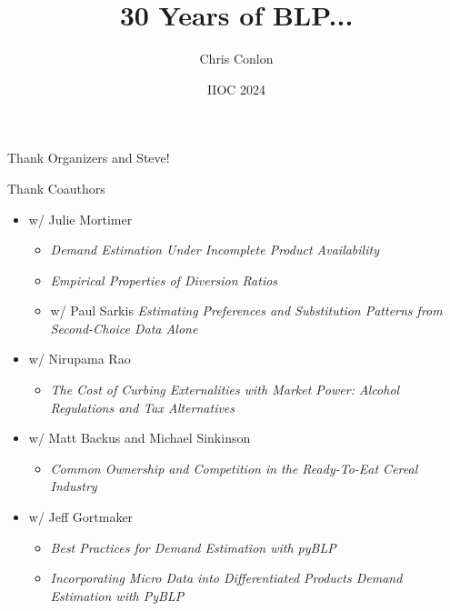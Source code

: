 \documentclass[aspectratio=169,10pt]{beamer}
\title{30 Years of BLP...}
\author{Chris Conlon}
\institute{NYU Stern School of Business and NBER}
\date{IIOC 2024}
\begin{document}
\begin{frame}[plain] %
\titlepage
\end{frame}



\begin{frame}{}
Thank Organizers and Steve!
\end{frame}


\begin{frame}{Thank Coauthors}
\begin{itemize}
    \item w/ Julie Mortimer

    \begin{itemize}
        \item \textit{Demand Estimation Under Incomplete Product Availability}
        \item \textit {Empirical Properties of Diversion Ratios}
        \item w/ Paul Sarkis \textit{Estimating Preferences and Substitution Patterns from Second-Choice Data Alone }
    \end{itemize}

    \item w/ Nirupama Rao

    \begin{itemize}
        \item \textit{The Cost of Curbing Externalities with Market Power: Alcohol Regulations and Tax Alternatives}
    \end{itemize}

    \item w/ Matt Backus and Michael Sinkinson

    \begin{itemize}
        \item \textit{Common Ownership and Competition in the Ready-To-Eat Cereal Industry}
    \end{itemize}

    \item w/ Jeff Gortmaker 
    \begin{itemize}
        \item \textit{Best Practices for Demand Estimation with pyBLP}
        \item \textit{Incorporating Micro Data into Differentiated Products Demand Estimation with PyBLP}
    \end{itemize}

\end{itemize}
\end{frame}
\end{document}

